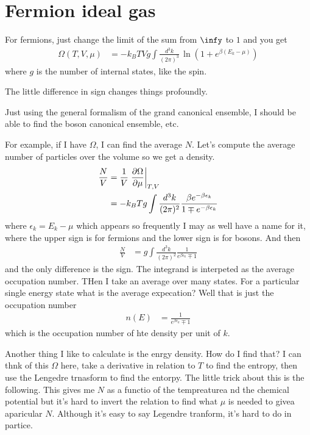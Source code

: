 \section{Fermion ideal gas}
For fermions,
just change the limit of the sum from $\infy$ to $1$
and you get
\begin{align}
    \Omega(T, V, \mu) &=
    -k_B T V g \int \frac{d^3k}{(2\pi)^3}\,
    \ln\left( 
    1 + e^{\beta(E_k - \mu)}
    \right)
\end{align}
where $g$ is the number of internal states,
like the spin.

The little difference in sign changes things profoundly.

Just using the general formalism of the grand canonical ensemble,
I should be able to find the boson canonical ensemble,
etc.


For example,
if I have $\Omega$,
I can find the average $N$.
Let's compute the average number of particles over the volume so we get a
density.
\begin{align}
    \frac{N}{V} &=
    \frac{1}{V}
    \left. \frac{\partial \Omega}{\partial\mu}\right|_{T,V}\\
    &=
    - k_B T g
    \int \frac{d^3k}{(2\pi)^2}
    \frac{ \beta e^{-\beta \epsilon_k}}{%
        1 \mp e^{-\beta \epsilon_k}
    }
\end{align}
where $\epsilon_k=E_k - \mu$ which appears so frequently I may as well have a
name for it,
where the upper sign is for fermions and the lower sign is for bosons.
And then
\begin{align}
    \frac{N}{V} &=
    g \int \frac{d^3k}{(2\pi)^2}
    \frac{1}{e^{\beta\epsilon_k}\mp 1}
\end{align}
and the only difference is the sign.
The integrand is interpeted as the average occupation number.
THen I take an average over many states.
For a particular single energy state
what is the average expecation?
Well that is just the occupation number
\begin{align}
    n(E) &=
    \frac{1}{e^{\beta\epsilon_k}\mp 1}
\end{align}
which is the occupation number of hte density per unit of $k$.

Another thing I like to calculate is the enrgy density.
How do I find that?
I can thnk of this $\Omega$ here,
take a derivative in relation to $T$ to find the entropy,
then use the Lengedre trnasform to find the entorpy.
The little trick about this is the following.
This gives me $N$ as a functio of the tempreaturea nd the chemical potential
but it's hard to invert the relation to find what $\mu$ is needed to givea
aparicular $N$.
Although it's easy to say Legendre tranform,
it's hard to do in partice.

